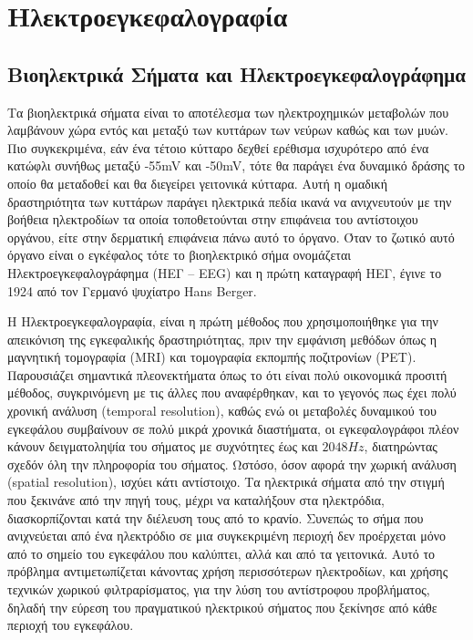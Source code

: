 \documentclass[11pt,a4paper,english,greek,twoside]{../Thesis}
\begin{document}
\chapter{Ηλεκτροεγκεφαλογραφία}
\section{Βιοηλεκτρικά Σήματα και Ηλεκτροεγκεφαλογράφημα}
Τα βιοηλεκτρικά σήματα είναι το αποτέλεσμα των ηλεκτροχημικών μεταβολών που λαμβάνουν χώρα εντός και μεταξύ των κυττάρων των νεύρων καθώς και των μυών. Πιο συγκεκριμένα, εάν ένα τέτοιο κύτταρο δεχθεί ερέθισμα ισχυρότερο από ένα κατώφλι συνήθως μεταξύ  -55mV και -50mV, τότε θα παράγει ένα δυναμικό δράσης το οποίο θα μεταδοθεί και θα διεγείρει γειτονικά κύτταρα. Αυτή η ομαδική δραστηριότητα των κυττάρων παράγει ηλεκτρικά πεδία ικανά να ανιχνευτούν με την βοήθεια ηλεκτροδίων τα οποία τοποθετούνται στην επιφάνεια του αντίστοιχου οργάνου, είτε στην δερματική επιφάνεια πάνω αυτό το όργανο. Όταν το ζωτικό αυτό όργανο είναι ο εγκέφαλος τότε το βιοηλεκτρικό σήμα ονομάζεται Ηλεκτροεγκεφαλογράφημα (ΗΕΓ – EEG) και η πρώτη καταγραφή ΗΕΓ, έγινε το 1924 από τον Γερμανό ψυχίατρο Hans Berger. 

Η Ηλεκτροεγκεφαλογραφία, είναι η πρώτη μέθοδος που χρησιμοποιήθηκε για την απεικόνιση της εγκεφαλικής δραστηριότητας, πριν την εμφάνιση μεθόδων όπως η μαγνητική τομογραφία (MRI) και τομογραφία εκπομπής ποζιτρονίων (PET). Παρουσιάζει σημαντικά πλεονεκτήματα όπως το ότι είναι πολύ οικονομικά προσιτή μέθοδος, συγκρινόμενη με τις άλλες που αναφέρθηκαν, και το γεγονός πως έχει πολύ χρονική ανάλυση (temporal resolution), καθώς ενώ οι μεταβολές δυναμικού του εγκεφάλου συμβαίνουν σε πολύ μικρά χρονικά διαστήματα, οι εγκεφαλογράφοι πλέον κάνουν δειγματοληψία του σήματος με συχνότητες έως και $2048Hz$, διατηρώντας σχεδόν όλη την πληροφορία του σήματος. Ωστόσο, όσον αφορά την χωρική ανάλυση (spatial resolution), ισχύει κάτι αντίστοιχο. Τα ηλεκτρικά σήματα από την στιγμή που ξεκινάνε από την πηγή τους, μέχρι να καταλήξουν στα ηλεκτρόδια, διασκορπίζονται κατά την διέλευση τους από το κρανίο. Συνεπώς το σήμα που ανιχνεύεται από ένα ηλεκτρόδιο σε μια συγκεκριμένη περιοχή δεν προέρχεται μόνο από το σημείο του εγκεφάλου που καλύπτει, αλλά και από τα γειτονικά. Αυτό το πρόβλημα αντιμετωπίζεται κάνοντας χρήση περισσότερων ηλεκτροδίων, και χρήσης τεχνικών χωρικού φιλτραρίσματος, για την λύση του αντίστροφου προβλήματος, δηλαδή την εύρεση του πραγματικού ηλεκτρικού σήματος που ξεκίνησε από κάθε περιοχή του εγκεφάλου.
\end{document}
